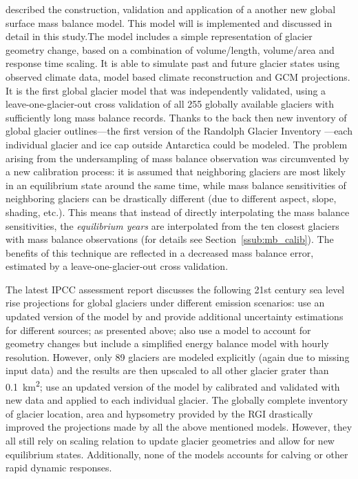     \citet{Marzeion2012b} described the construction, validation and application of a another new global surface mass balance model. This model will is implemented and discussed in detail in this study.The model includes a simple representation of glacier geometry change, based on a combination of volume/length, volume/area and response time scaling. It is able to simulate past and future glacier states using observed climate data, model based climate reconstruction and GCM projections. It is the first global glacier model that was independently validated, using a leave-one-glacier-out cross validation of all 255 globally available glaciers with sufficiently long mass balance records. Thanks to the back then new inventory of global glacier outlines---the first version of the Randolph Glacier Inventory \citep[RGI][]{Arendt2012_RGIv1.0}---each individual glacier and ice cap outside Antarctica could be modeled. The problem arising from the undersampling of mass balance observation was circumvented by a new calibration process: it is assumed that neighboring glaciers are most likely in an equilibrium state around the same time, while mass balance sensitivities of neighboring glaciers can be drastically different (due to different aspect, slope, shading, etc.). This means that instead of directly interpolating the mass balance sensitivities, the \textit{equilibrium years} are interpolated from the ten closest glaciers with mass balance observations (for details see Section~\ref{ssub:mb_calib}). The benefits of this technique are reflected in a decreased mass balance error, estimated by a leave-one-glacier-out cross validation. %

    The latest IPCC assessment report \citep[AR5, Chapter 13]{Church2013} discusses the following 21st century sea level rise projections for global glaciers under different emission scenarios: \citet{Slangen2011} use an updated version of the model by \citet{VanDeWal2001} and provide additional uncertainty estimations for different sources; \citet{Marzeion2012b} as presented above; \citet{Giesen2013} also use a \vas{} model to account for geometry changes but include a simplified energy balance model with hourly resolution. However, only 89 glaciers are modeled explicitly (again due to missing input data) and the results are then upscaled to all other glacier grater than \SI{0.1}{\square\kilo\meter}; \citet{Radic2014a} use an updated version of the model by \citet{Radic2011} calibrated and validated with new data and applied to each individual glacier. The globally complete inventory of glacier location, area and hypsometry provided by the RGI drastically improved the projections made by all the above mentioned models. However, they all still rely on scaling relation to update glacier geometries and allow for new equilibrium states. Additionally, none of the models accounts for calving or other rapid dynamic responses.

